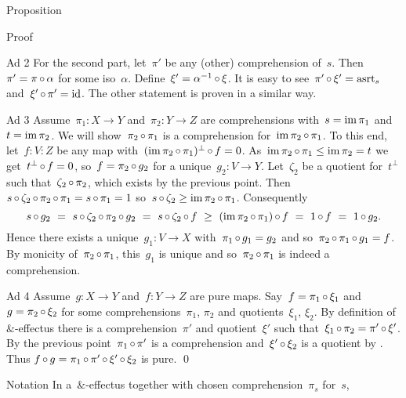 \documentclass[b]{subfiles}
\begin{document}
\begin{parsec}
\begin{point}{Proposition}
\begin{point}{Proof}
\begin{point}{Ad 2}
For the second part,
let~$\pi'$ be any (other) comprehension of~$s$.
Then~$\pi' = \pi \mathop{\circ} \alpha$ for some iso~$\alpha$.
Define~$\xi' = \alpha^{-1} \mathop{\circ} \xi$.
It is easy to see~$\pi' \mathop{\circ} \xi' = \mathrm{asrt}_s$
and~$\xi' \mathop{\circ} \pi' = \operatorname{id}$.
The other statement is proven in a similar way.
\end{point}
\begin{point}{Ad 3}%
Assume~$\pi_1 \colon X \to Y$
    and~$\pi_2 \colon Y \to Z$
    are comprehensions with~$s = \operatorname{im} \pi_1$
    and~$t = \operatorname{im} \pi_2$.
We will show~$\pi_2 \mathop{\circ} \pi_1$
    is a comprehension for~$\operatorname{im} \pi_2 \mathop{\circ} \pi_1$.
To this end, let~$f\colon V\colon Z$ be any map
with~$(\operatorname{im} \pi_2 \mathop{\circ} \pi_1)^\perp \mathop{\circ} f = 0$.
As~$\operatorname{im} \pi_2 \mathop{\circ} \pi_1 \leq \operatorname{im} \pi_2 = t$
    we get~$t^\perp \mathop{\circ} f = 0$,
    so~$f = \pi_2 \mathop{\circ} g_2$ for a unique~$g_2\colon V \to Y$.
Let~$\zeta_2$ be a quotient for~$t^\perp$
such that~$\zeta_2 \mathop{\circ} \pi_2$,
which exists by the previous point.
Then~$s \mathop{\circ} \zeta_2 \mathop{\circ} \pi_2 \mathop{\circ} \pi_1
            = s \mathop{\circ} \pi_1 = 1$
            so~$s \mathop{\circ} \zeta_2 \geq \operatorname{im} \pi_2 \mathop{\circ} \pi_1$.
Consequently
\begin{equation*}
    s \mathop{\circ} g_2 \ =\  s \mathop{\circ} \zeta_2 \mathop{\circ} \pi_2 \mathop{\circ} g_2
        \ =\  s \mathop{\circ} \zeta_2 \mathop{\circ} f
        \ \geq\   (\operatorname{im} \pi_2 \mathop{\circ} \pi_1) \mathop{\circ} f \ =\  1 \mathop{\circ} f
                \ =\  1 \mathop{\circ} g_2.
\end{equation*}
Hence there exists a unique~$g_1\colon V \to X$
    with~$\pi_1 \mathop{\circ} g_1 = g_2$
    and so~$\pi_2 \mathop{\circ} \pi_1 \mathop{\circ} g_1 = f$.
By monicity of~$\pi_2 \mathop{\circ} \pi_1$,
    this~$g_1$ is unique and so~$\pi_2 \mathop{\circ} \pi_1$
    is indeed a comprehension.
\end{point}
\begin{point}{Ad 4}%
Assume~$g\colon X \to Y$ and~$f\colon Y \to Z$ are pure maps.
Say~$f = \pi_1 \mathop{\circ} \xi_1$
    and~$g = \pi_2 \mathop{\circ} \xi_2$
    for some comprehensions~$\pi_1$, $\pi_2$
        and quotients~$\xi_1$, $\xi_2$.
By definition of $\&$-effectus
    there is a comprehension~$\pi'$ and quotient~$\xi'$
    such that~$\xi_1 \mathop{\circ} \pi_2 = \pi' \mathop{\circ} \xi'$.
By the previous point~$\pi_1 \mathop{\circ} \pi'$
    is a comprehension
    and~$\xi' \mathop{\circ} \xi_2$ is a quotient by .
Thus
$f \mathop{\circ} g 
=\pi_1 \mathop{\circ} \pi' \mathop{\circ} \xi' \mathop{\circ} \xi_2$
is pure. \qed
\end{point}
\end{point}
\begin{point}{Notation}%
In a~$\&$-effectus
    together with chosen comprehension~$\pi_s$ for~$s$,

\end{point}
\end{point}
\end{parsec}
\end{document}
